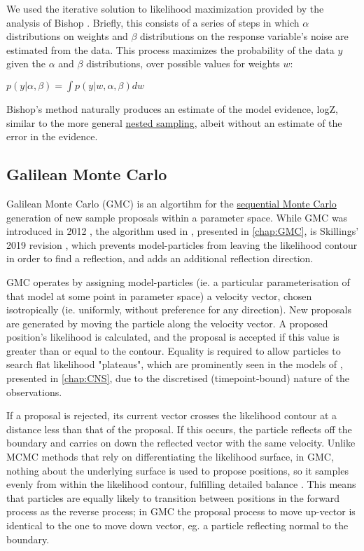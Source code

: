 We used the iterative solution to likelihood maximization provided by the analysis of Bishop \cite{Bishop2006}. Briefly, this consists of a series of steps in which $\alpha$ distributions on weights and $\beta$ distributions on the response variable's noise are estimated from the data. This process maximizes the probability of the data $y$ given the $\alpha$ and $\beta$ distributions, over possible values for weights $w$:

$p(y|\alpha,\beta) = \int p(y|w,\alpha,\beta)dw$

Bishop's method naturally produces an estimate of the model evidence, logZ, similar to the more general \hyperref[ssec:nested]{nested sampling}, albeit without an estimate of the error in the evidence.

\subsection{Galilean Monte Carlo}
\label{ssec:GMC}
Galilean Monte Carlo (GMC) is an algortihm for the \hyperref[ssec:MonteCarlo]{sequential Monte Carlo} generation of new sample proposals within a parameter space. While GMC was introduced in 2012 \cite{Skilling2012}, the algorithm used in , presented in \autoref{chap:GMC}, is Skillings' 2019 revision \cite{Skilling2019}, which prevents model-particles from leaving the likelihood contour in order to find a reflection, and adds an additional reflection direction. 

GMC operates by assigning model-particles (ie. a particular parameterisation of that model at some point in parameter space) a velocity vector, chosen isotropically (ie. uniformly, without preference for any direction). New proposals are generated by moving the particle along the velocity vector. A proposed position's likelihood is calculated, and the proposal is accepted if this value is greater than or equal to the contour. Equality is required to allow particles to search flat likelihood "plateaus", which are prominently seen in the models of , presented in \autoref{chap:CNS}, due to the discretised (timepoint-bound) nature of the observations.

If a proposal is rejected, its current vector crosses the likelihood contour at a distance less than that of the proposal. If this occurs, the particle reflects off the boundary and carries on down the reflected vector with the same velocity. Unlike MCMC methods that rely on differentiating the likelihood surface, in GMC, nothing about the underlying surface is used to propose positions, so it samples evenly from within the likelihood contour, fulfilling detailed balance \cite{Skilling2012}. This means that particles are equally likely to transition between positions in the forward process as the reverse process; in GMC the proposal process to move up-vector is identical to the one to move down vector, eg. a particle reflecting normal to the boundary.

